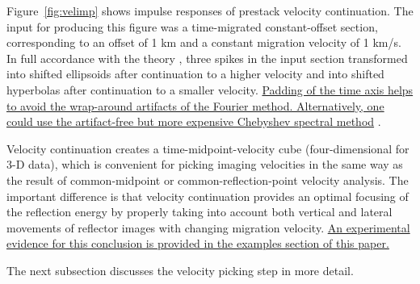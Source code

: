 \par  
Figure~\ref{fig:velimp} shows impulse responses of prestack velocity
continuation. The input for producing this figure was a time-migrated
constant-offset section, corresponding to an offset of 1 km and a constant
migration velocity of 1 km/s. In full accordance with the theory \cite{first},
three spikes in the input section transformed into shifted ellipsoids after
continuation to a higher velocity and into shifted hyperbolas after
continuation to a smaller velocity. \uline{
Padding of the time axis helps to avoid
the wrap-around artifacts of the Fourier method. Alternatively, one could use
the artifact-free but more expensive Chebyshev spectral method}
\cite{Fomel.sep.97.sergey2}.

\par

Velocity continuation creates a time-midpoint-velocity cube (four-dimensional
for 3-D data), which is convenient for picking imaging velocities in the same
way as the result of common-midpoint or common-reflection-point velocity
analysis. The important difference is that velocity continuation provides an
optimal focusing of the reflection energy by properly taking into account both
vertical and lateral movements of reflector images with changing migration
velocity. \uline{An experimental evidence for this conclusion is provided in
  the examples section of this paper.}

\begin{comment}
Figure \ref{fig:consmb} compares velocity spectra
(semblance panels) at a CIP location of about 11.5 km after residual
NMO and after prestack velocity continuation. Although the overall
difference between the two panels is small, the velocity continuation
panel shows a noticeably better focusing, especially in the region of
conflicting dips between 1 and 2 seconds. 
\end{comment}
The next subsection discusses
the velocity picking step in more detail.

